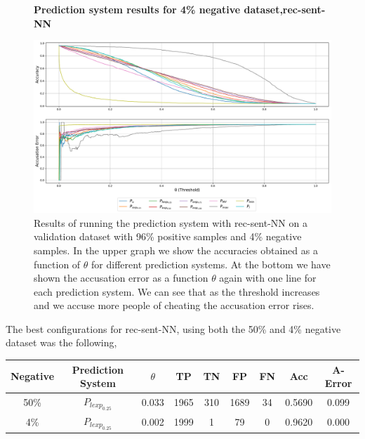 \begin{figure}
    \centering
    \textbf{Prediction system results for 4\% negative dataset,\gls{rec-sent-NN}}\par\medskip
    \includegraphics[scale=0.33]{./pictures/experiments/rec_sent_nn/prediction_system_04}
    \caption{Results of running the prediction system with \gls{rec-sent-NN} on
        a validation dataset with 96\% positive samples and 4\% negative
        samples. In the upper graph we show the accuracies obtained as a
        function of $\theta$ for different prediction systems. At the bottom we
        have shown the accusation error as a function $\theta$ again with one
        line for each prediction system. We can see that as the threshold
        increases and we accuse more people of cheating the accusation error
        rises.}
    \label{fig:rec-sent-NN-pred-4}
\end{figure}

The best configurations for \gls{rec-sent-NN}, using both the 50\% and
4\% negative dataset was the following,

\begin{center}
    \begin{adjustbox}{center}
    \begin{tabular}{|c|c|c|c|c|c|c|c|c|}
        \hline
        Negative  & Prediction System & $\theta$ & TP   & TN  & FP   & FN  &
        Acc       & A-Error
        \\ \hline
        50\%      & $P_{lexp_{0.25}}$ & 0.033    & 1965 & 310 & 1689 & 34  &
        0.5690    & 0.099
        \\ \hline
        4\%       & $P_{lexp_{0.25}}$ & 0.002    & 1999 & 1   & 79   & 0   &
        0.9620    & 0.000
        \\ \hline
    \hline
    \end{tabular}
    \end{adjustbox}
\end{center}

